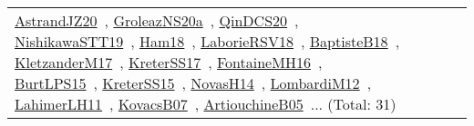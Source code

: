 {\begin{longtable}{lp{3cm}>{\raggedright\arraybackslash}p{6cm}>{\raggedright\arraybackslash}p{6cm}>{\raggedright\arraybackslash}p{8cm}}
\href{works/AstrandJZ20.pdf}{AstrandJZ20}~\cite{AstrandJZ20}, \href{works/GroleazNS20a.pdf}{GroleazNS20a}~\cite{GroleazNS20a}, \href{works/QinDCS20.pdf}{QinDCS20}~\cite{QinDCS20}, \href{works/NishikawaSTT19.pdf}{NishikawaSTT19}~\cite{NishikawaSTT19}, \href{works/Ham18.pdf}{Ham18}~\cite{Ham18}, \href{works/LaborieRSV18.pdf}{LaborieRSV18}~\cite{LaborieRSV18}, \href{works/BaptisteB18.pdf}{BaptisteB18}~\cite{BaptisteB18}, \href{works/KletzanderM17.pdf}{KletzanderM17}~\cite{KletzanderM17}, \href{works/KreterSS17.pdf}{KreterSS17}~\cite{KreterSS17}, \href{works/FontaineMH16.pdf}{FontaineMH16}~\cite{FontaineMH16}, \href{works/BurtLPS15.pdf}{BurtLPS15}~\cite{BurtLPS15}, \href{works/KreterSS15.pdf}{KreterSS15}~\cite{KreterSS15}, \href{works/NovasH14.pdf}{NovasH14}~\cite{NovasH14}, \href{works/LombardiM12.pdf}{LombardiM12}~\cite{LombardiM12}, \href{works/LahimerLH11.pdf}{LahimerLH11}~\cite{LahimerLH11}, \href{works/KovacsB07.pdf}{KovacsB07}~\cite{KovacsB07}, \href{works/ArtiouchineB05.pdf}{ArtiouchineB05}~\cite{ArtiouchineB05}... (Total: 31)\\

\end{longtable}}
